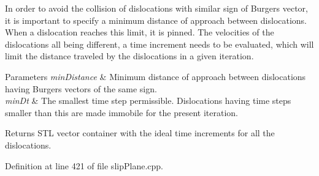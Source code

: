 \-In order to avoid the collision of dislocations with similar sign of \-Burgers vector, it is important to specify a minimum distance of approach between dislocations. \-When a dislocation reaches this limit, it is pinned. \-The velocities of the dislocations all being different, a time increment needs to be evaluated, which will limit the distance traveled by the dislocations in a given iteration. 
\begin{DoxyParams}{\-Parameters}
{\em min\-Distance} & \-Minimum distance of approach between dislocations having \-Burgers vectors of the same sign. \\
\hline
{\em min\-Dt} & \-The smallest time step permissible. \-Dislocations having time steps smaller than this are made immobile for the present iteration. \\
\hline
\end{DoxyParams}
\begin{DoxyReturn}{\-Returns}
\-S\-T\-L vector container with the ideal time increments for all the dislocations. 
\end{DoxyReturn}


\-Definition at line 421 of file slip\-Plane.\-cpp.


